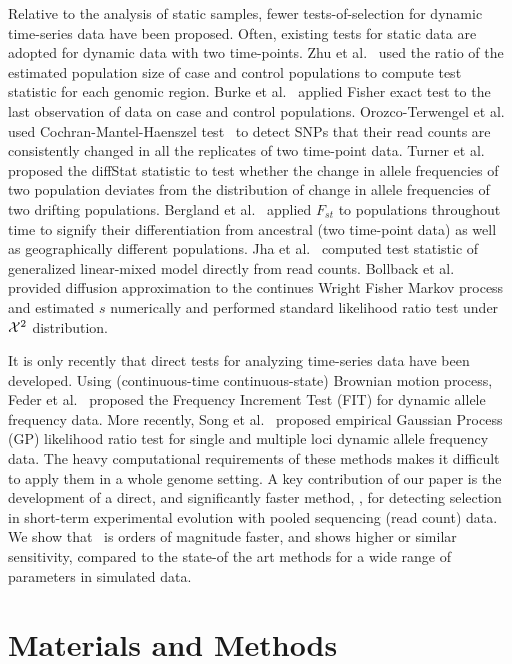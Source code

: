 \documentclass[11pt]{article}
\def\comale{\text{{\sc Comale}}}
\begin{document}
Relative to the analysis of static samples, fewer tests-of-selection
for dynamic time-series data have been proposed. Often, existing tests
for static data are adopted for dynamic data with two time-points. Zhu
et al.~\cite{zhou2011experimental} used the ratio of the estimated
population size of case and control populations to compute test
statistic for each genomic region. Burke et al.~\cite{burke2010genome}
applied Fisher exact test to the last observation of data on case and
control populations.  Orozco-Terwengel et
al.~\cite{orozco2012adaptation} used Cochran-Mantel-Haenszel
test~\cite{agresti2011categorical} to detect SNPs that their read
counts are consistently changed in all the replicates of two
time-point data.  Turner et al.~\cite{turner2011population} proposed
the diffStat statistic to test whether the change in allele
frequencies of two population deviates from the distribution of change
in allele frequencies of two drifting populations.  Bergland et
al.~\cite{bergland2014genomic} applied $F_{st}$ to populations
throughout time to signify their differentiation from ancestral (two
time-point data) as well as geographically different populations.  Jha
et al.~\cite{jha2015whole} computed test statistic of generalized
linear-mixed model directly from read counts.  Bollback et
al.~\cite{bollback2008estimation} provided diffusion approximation to
the continues Wright Fisher Markov process and estimated $s$
numerically and performed standard likelihood ratio test under ${\cal X}^2$
distribution. 

It is only recently that direct tests for analyzing time-series data
have been developed. Using (continuous-time continuous-state) Brownian
motion process, Feder et al.~\cite{feder2014Identifying} proposed the
Frequency Increment Test (FIT) for dynamic allele frequency data. More
recently, Song et al.~\cite{Terhorst2015Multi} proposed empirical
Gaussian Process (GP) likelihood ratio test for single and multiple
loci dynamic allele frequency data. The heavy computational
requirements of these methods makes it difficult to apply them in a
whole genome setting. A key contribution of our paper is the
development of a direct, and significantly faster method, \comale, for
detecting selection in short-term experimental evolution with pooled
sequencing (read count) data.  We show that \comale\ is orders of
magnitude faster, and shows higher or similar sensitivity, compared to
the state-of the art methods for a wide range of parameters in
simulated data.

\section{Materials and Methods}
\end{document}
